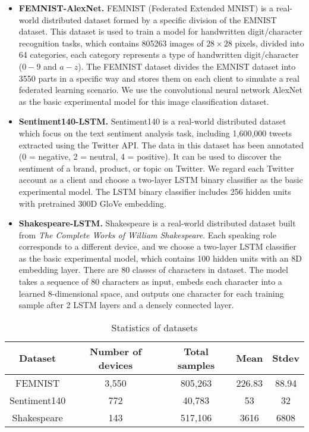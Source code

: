 \documentclass[10pt,journal,compsoc]{IEEEtran}
\begin{document}
\begin{itemize}
  \item \textbf{FEMNIST-AlexNet.}\cite{caldas2019leaf}  FEMNIST (Federated Extended MNIST) is a real-world distributed dataset formed by a specific division of the EMNIST dataset. This dataset is used to train a model for handwritten digit/character recognition tasks, which contains 805263 images of $28 \times 28$ pixels, divided into 64 categories, each category represents a type of handwritten digit/character ($0-9$ and $a-z$). The FEMNIST dataset divides the EMNIST dataset into 3550 parts in a specific way and stores them on each client to simulate a real federated learning scenario. We use the convolutional neural network AlexNet as the basic experimental model for this image classification dataset.
  \item \textbf{Sentiment140-LSTM.} \cite{sent140} Sentiment140 is a real-world distributed dataset which focus on the text sentiment analysis task, including 1,600,000 tweets extracted using the Twitter API. The data in this dataset has been annotated (0 = negative, 2 = neutral, 4 = positive). It can be used to discover the sentiment of a brand, product, or topic on Twitter. We regard each Twitter account as a client and choose a two-layer LSTM binary classifier as the basic experimental model. The LSTM binary classifier includes 256 hidden units with pretrained 300D GloVe embedding\cite{pennington2014glove}.  
  \item {\textbf{Shakespeare-LSTM.} \cite{DBLP:conf/aistats/McMahanMRHA17} Shakespeare is a real-world distributed dataset built from \textit{The Complete Works of William Shakespeare}. Each speaking role corresponds to a different device, and we choose a two-layer LSTM classifier as the basic experimental model, which contains 100 hidden units with an 8D embedding layer. There are 80 classes of characters in dataset. The model takes a sequence of 80 characters as input, embeds each character into a learned 8-dimensional space, and outputs one character for each training sample after 2 LSTM layers and a densely connected layer.}
\end{itemize}

\begin{table*}[h]
\caption{Statistics of datasets}
\label{noniidlevel}
\centering
\begin{tabular}{c c c c c}
\toprule
  Dataset & Number of devices & Total samples & Mean & Stdev \\
  \midrule
  FEMNIST & 3,550 & 805,263 & 226.83 & 88.94 \\
  Sentiment140 & 772 & 40,783 & 53 & 32\\ 
  {Shakespeare} & {143} & {517,106} & {3616} & {6808}\\
\bottomrule
\end{tabular}



\end{table*}
\end{document}
